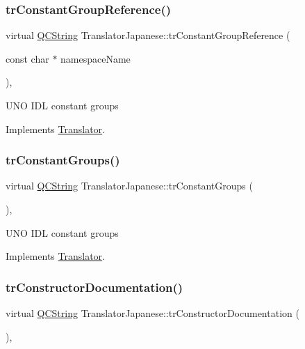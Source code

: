 \subsubsection{\texorpdfstring{trConstantGroupReference()}{trConstantGroupReference()}}
{\footnotesize\ttfamily virtual \mbox{\hyperlink{class_q_c_string}{Q\+C\+String}} Translator\+Japanese\+::tr\+Constant\+Group\+Reference (\begin{DoxyParamCaption}\item[{const char $\ast$}]{namespace\+Name }\end{DoxyParamCaption})\hspace{0.3cm}{\ttfamily [inline]}, {\ttfamily [virtual]}}

U\+NO I\+DL constant groups 

Implements \mbox{\hyperlink{class_translator}{Translator}}.

\mbox{\label{class_translator_japanese_a012b03719809e57b67b162f97337ba70}} 
\subsubsection{\texorpdfstring{trConstantGroups()}{trConstantGroups()}}
{\footnotesize\ttfamily virtual \mbox{\hyperlink{class_q_c_string}{Q\+C\+String}} Translator\+Japanese\+::tr\+Constant\+Groups (\begin{DoxyParamCaption}{ }\end{DoxyParamCaption})\hspace{0.3cm}{\ttfamily [inline]}, {\ttfamily [virtual]}}

U\+NO I\+DL constant groups 

Implements \mbox{\hyperlink{class_translator}{Translator}}.

\mbox{\label{class_translator_japanese_ad0c8515f91e3f7b545411d5e0d771cbb}} 
\subsubsection{\texorpdfstring{trConstructorDocumentation()}{trConstructorDocumentation()}}
{\footnotesize\ttfamily virtual \mbox{\hyperlink{class_q_c_string}{Q\+C\+String}} Translator\+Japanese\+::tr\+Constructor\+Documentation (\begin{DoxyParamCaption}{ }\end{DoxyParamCaption})\hspace{0.3cm}{\ttfamily [inline]}, {\ttfamily [virtual]}}

